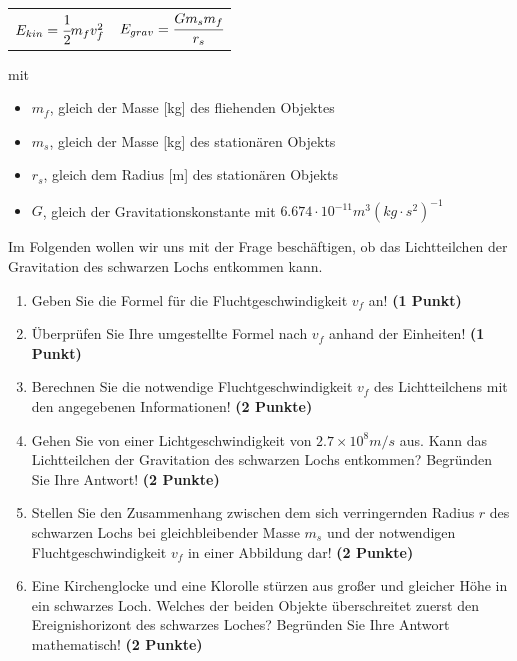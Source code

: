 \documentclass[a4paper, 9pt]{scrartcl}\usepackage[]{graphicx}\usepackage[]{xcolor}
\begin{document}
\begin{center}
  \begin{tabular}{cc}
    $E_{kin} = \cfrac{1}{2}m_fv_f^2$ & $E_{grav} = \cfrac{Gm_sm_f}{r_s}$\\
  \end{tabular}
\end{center}

mit

\begin{itemize}[noitemsep]
\item $m_f$, gleich der Masse [kg] des fliehenden Objektes
\item $m_s$, gleich der Masse [kg] des station{\"a}ren Objekts
\item $r_s$, gleich dem Radius [m] des station{\"a}ren Objekts  
\item $G$, gleich der Gravitationskonstante mit $6.674 \cdot 10^{-11}
  m^3(kg \cdot s^2)^{-1}$ 
\end{itemize}

Im Folgenden wollen wir uns mit der Frage besch{\"a}ftigen, ob das
Lichtteilchen der Gravitation des schwarzen Lochs entkommen kann.

\begin{enumerate}
\item Geben Sie die Formel f{\"u}r die Fluchtgeschwindigkeit $v_f$ an! 
  \textbf{(1 Punkt)}
\item {\"U}berpr{\"u}fen Sie Ihre umgestellte Formel nach $v_f$ anhand der Einheiten!
  \textbf{(1 Punkt)} 
\item Berechnen Sie die notwendige Fluchtgeschwindigkeit $v_f$ des
  Lichtteilchens mit den angegebenen Informationen! \textbf{(2 Punkte)}
\item Gehen Sie von einer Lichtgeschwindigkeit von $\ensuremath{2.7\times 10^{8}}m/s$
  aus. Kann das Lichtteilchen der Gravitation des schwarzen Lochs
  entkommen? Begr{\"u}nden Sie Ihre Antwort! \textbf{(2 Punkte)}
\item Stellen Sie den Zusammenhang zwischen dem sich verringernden Radius
  $r$ des schwarzen Lochs bei gleichbleibender Masse $m_s$
  und der notwendigen Fluchtgeschwindigkeit $v_f$ in einer Abbildung dar!
  \textbf{(2 Punkte)}
 \item Eine Kirchenglocke und eine Klorolle st{\"u}rzen aus gro{\ss}er und gleicher H{\"o}he
  in ein schwarzes Loch. Welches der beiden Objekte {\"u}berschreitet zuerst
  den Ereignishorizont des schwarzes Loches? Begr{\"u}nden
  Sie Ihre Antwort mathematisch! \textbf{(2 Punkte)}  
\end{enumerate}
\end{document}
